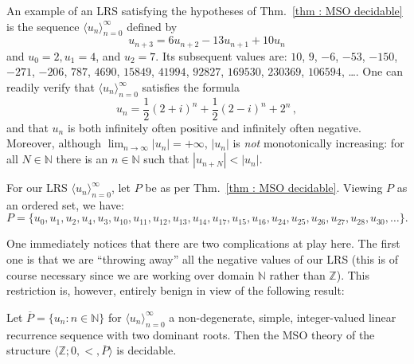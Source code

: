 \documentclass[a4paper,UKenglish,cleveref, autoref, thm-restate]{lipics-v2021}
\newcommand{\nat} {\mathbb{N}}
\begin{document}
An example of an LRS satisfying the hypotheses of Thm.~\ref{thm :
  MSO decidable} is the sequence $\langle u_n\rangle_{n=0}^\infty$ defined by
\begin{equation}\label{eq : example LRS}
    u_{n+3} = 6u_{n+2} - 13u_{n+1} + 10 u_n
\end{equation}
and $u_0 = 2, u_1 = 4$, and $u_2 = 7$. 
Its subsequent values are:
$10$,
$9$,
 $-6$,
 $-53$,
 $-150$,
 $-271$,
 $-206$,
 $787$,
 $4690$,
 $15849$,
 $41994$,
 $92827$,
 $169530$,
 $230369$,
 $106594$, \dots.
One can readily verify that $\langle u_n \rangle_{n=0}^\infty$ satisfies the formula
\begin{equation}\label{eq : example LRS poly exp form}
    u_n = \frac{1}{2}(2+i)^n + \frac{1}{2}(2-i)^n + 2^n \, ,
\end{equation}
and that $u_n$ is both infinitely often positive and infinitely often negative.
Moreover, although $\lim_{n\to \infty}|u_n| = +\infty$, $|u_n|$ is \emph{not}
monotonically increasing: for all $N \in \nat$ there is an $n \in \nat$ such that
$|u_{n+N}| < |u_n|$.

For our LRS $\langle u_n\rangle_{n=0}^\infty$, let $P$ be as per Thm.~\ref{thm : MSO decidable}. Viewing $P$ as an
ordered set, we have:
\begin{equation*}
    P = \{ u_0, u_1, u_2, u_4, u_3, u_{10}, u_{11}, u_{12}, u_{13},
        u_{14}, u_{17}, u_{15}, u_{16}, u_{24},  u_{25}, u_{26}, u_{27}, u_{28},   u_{30},\dots\}.
\end{equation*}

One immediately notices that there are two complications at play
here. The first one is that we are ``throwing away'' all the negative
values of our LRS (this is of course necessary since we are working over
domain $\nat$ rather than $\mathbb{Z}$). This restriction is, however,
entirely benign in view of the following result:

\begin{corollary}\label{cor : Z-MSO decidable}
    Let $\overline{P} = \{u_n \colon n \in \nat\}$ for $\langle u_n
    \rangle_{n=0}^\infty$ a 
    non-degenerate, simple, integer-valued linear recurrence
    sequence with two dominant roots. 
    Then the MSO theory of the structure $\langle \mathbb{Z} ; 0, < , \overline{P} \rangle$ is decidable.
\end{corollary}
\end{document}
